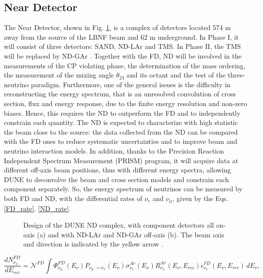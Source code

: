 \subsection{Near Detector}
The Near Detector, shown in Fig. \ref{fig:ND}, is a complex of detectors located 574 m away from the source of the LBNF beam and 62 m underground. In Phase I, it will consist of three detectors: SAND, ND-LAr and TMS. In Phase II, the TMS will be replaced by ND-GAr \cite{nd_cdr}.
Together with the FD, ND will be involved in the measurements of the CP violating phase, the determination of the mass ordering, the measurement of the mixing angle $\theta_{23}$ and its octant and the test of the three-neutrino paradigm. Furthermore, one of the general issues is the difficulty in reconstructing the energy spectrum, that is an unresolved convolution of cross section, flux and energy response, due to the finite energy resolution and non-zero biases. Hence, this requires the ND to outperform the FD and to independently constrain each quantity. The ND is expected to characterize with high statistic the beam close to the source: the data collected from the ND can be compared with the FD ones to reduce systematic uncertainties and to improve beam and neutrino interaction models. In addition, thanks to the Precision Reaction Independent Spectrum Measurement (PRISM) program, it will acquire data at different off-axis beam positions, thus with different energy spectra, allowing DUNE to deconvolve the beam and cross section models and constrain each component separately. 
So, the energy spectrum of neutrinos can be measured by both FD and ND, with the differential rates of $\nu_e$ and $\nu_{\mu}$, given by the Eqs. \ref{FD_rate}, \ref{ND_rate}.

\begin{figure}
    \centering
    \caption{Design of the DUNE ND complex, with component detectors all on-axis (a) and with ND-LAr and ND-GAr off-axis (b). The beam axis and direction is indicated by the yellow arrow \cite{nd_cdr}.}
    \label{fig:ND}
\end{figure}

\begin{equation}
\label{FD_rate}
    \frac{dN^{FD}_{\nu_x}}{dE_{rec}} = \mathcal{N}^{FD} \int \Phi^{FD}_{\nu_{\mu}}(E_\nu) P_{\nu_{\mu}\rightarrow \nu_x}(E_\nu) \sigma^{Ar}_{\nu_x}(E_\nu)R^{Ar}_{\nu_x}(E_\nu, E_{rec}) \epsilon^{FD}_{\nu_x}(E_\nu, E_{rec}) \,dE_\nu, 
\end{equation}

